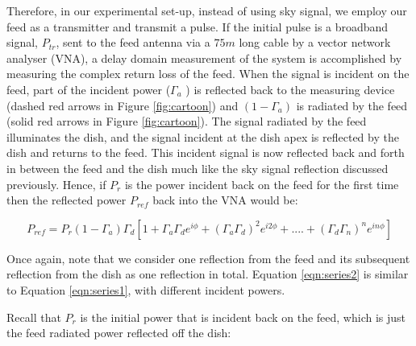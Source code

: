 \documentclass[12pt,preprint]{aastex}
\begin{document}

Therefore, in our experimental set-up, instead of using sky signal, we employ
our feed as a transmitter and transmit a pulse. If the initial pulse is a broadband signal,
$P_{tr}$, sent to the feed antenna via a $75m$ long cable by a vector network
analyser (VNA), a delay domain measurement of the system is accomplished by
measuring the complex return loss of the feed. When the signal is incident on
the feed, part of the incident power ($\Gamma_{a}$ ) is reflected back to the
measuring device (dashed red arrows in Figure \ref{fig:cartoon}) and
$(1-\Gamma_{a})$ is radiated by the feed (solid red arrows in Figure
\ref{fig:cartoon}). The signal radiated by the feed illuminates the dish, and
the signal incident at the dish apex is reflected by the dish and returns to
the feed. This incident signal is now reflected back and forth in between the
feed and the dish much like the sky signal reflection discussed previously.
Hence, if $P_{r}$ is the power incident back on the feed for the first time
then the reflected power $P_{ref}$ back into the VNA would be:

\begin{equation}\label{eqn:series2}
P_{ref} =  P_{r}(1-\Gamma_{a}) \Gamma_{d}[1+ \Gamma_{a}\Gamma_{d} e^{i\phi}+ (\Gamma_{a}\Gamma_{d})^2e^{i2\phi}+ ....+ (\Gamma_{d}\Gamma_{n})^{n}e^{in\phi}]
\end{equation}
 
Once again, note that we consider one reflection from the feed and its subsequent reflection from the dish as one reflection in total. Equation \ref{eqn:series2} is similar to Equation \ref{eqn:series1}, with different incident powers.

Recall that $P_{r}$ is the initial power that is incident back on the feed, which is just the feed radiated power reflected off the dish:
 
\end{document}
